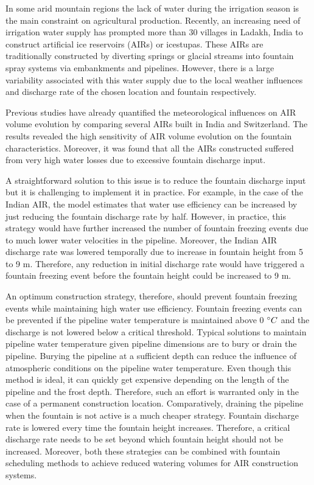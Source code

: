 \documentclass[tc, manuscript]{copernicus}
\begin{document}
\introduction

In some arid mountain regions the lack of water during the irrigation season is the main constraint on
agricultural production. Recently, an increasing need of irrigation water supply has prompted more than 30
villages in Ladakh, India to construct artificial ice reservoirs (AIRs) or icestupas. These AIRs are
traditionally constructed by diverting springs or glacial streams into fountain spray systems via
embankments and pipelines. However, there is a large variability associated with this water supply due to the
local weather influences and discharge rate of the chosen location and fountain respectively. 

Previous studies \citep{balasubramanianInfluenceMeteorologicalConditions2022,
oerlemansBriefCommunicationGrowth2021} have already quantified the meteorological influences on AIR volume
evolution by comparing several AIRs built in India and Switzerland. The results revealed the high sensitivity of
AIR volume evolution on the fountain characteristics. Moreover, it was found that all the AIRs constructed
suffered from very high water losses due to excessive fountain discharge input. 

A straightforward solution to this issue is to reduce the fountain discharge input but it is challenging to
implement it in practice. For example, in the case of the Indian AIR, the model estimates that water use
efficiency can be increased by just reducing the fountain discharge rate by half. However, in practice, this
strategy would have further increased the number of fountain freezing events due to much lower water velocities
in the pipeline. Moreover, the Indian AIR discharge rate was lowered temporally due to increase in fountain
height from 5 to 9 m. Therefore, any reduction in initial discharge rate would have triggered a fountain
freezing event before the fountain height could be increased to 9 m.

An optimum construction strategy, therefore, should prevent fountain freezing events while maintaining high
water use efficiency. Fountain freezing events can be prevented if the pipeline water temperature is maintained
above 0 $^{\circ} C$ and the discharge is not lowered below a critical threshold. Typical solutions to maintain
pipeline water temperature given pipeline dimensions are to bury or drain the pipeline. Burying the pipeline at
a sufficient depth can reduce the influence of atmospheric conditions on the pipeline water temperature. Even
though this method is ideal, it can quickly get expensive depending on the length of the pipeline and the frost
depth. Therefore, such an effort is warranted only in the case of a permanent construction location.
Comparatively, draining the pipeline when the fountain is not active is a much cheaper strategy. Fountain
discharge rate is lowered every time the fountain height increases. Therefore, a critical discharge rate needs
to be set beyond which fountain height should not be increased. Moreover, both these strategies can be combined
with fountain scheduling methods to achieve reduced watering volumes for AIR construction systems. 
\end{document}
